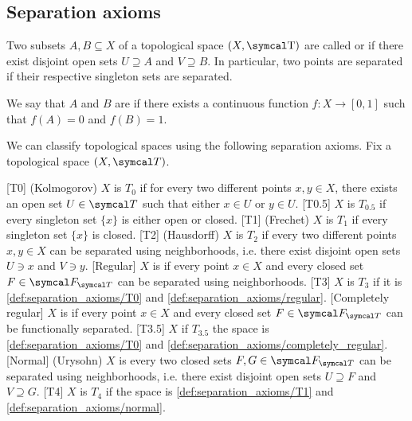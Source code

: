 \subsection{Separation axioms}\label{subsec:separation_axioms}

\begin{definition}\label{def:topological_space_separation}
  Two subsets \( A, B \subseteq X \) of a topological space \( (X, \T) \) are called  or  if there exist disjoint open sets \( U \supseteq A \) and \( V \supseteq B \). In particular, two points are separated if their respective singleton sets are separated.

  We say that \( A \) and \( B \) are  if there exists a continuous function \( f: X \to [0, 1] \) such that \( f(A) = 0 \) and \( f(B) = 1 \).
\end{definition}

\begin{definition}\label{def:separation_axioms}
  We can classify topological spaces using the following separation axioms. Fix a topological space \( (X, \Cal{T}) \).

  \begin{description}
    [T0] (Kolmogorov) \( X \) is \( T_0 \) if for every two different points \( x, y \in X \), there exists an open set \( U \in \Cal{T} \) such that either \( x \in U \) or \( y \in U \).
    [T0.5] \( X \) is \( T_{0.5} \) if every singleton set \( \{ x \} \) is either open or closed.
    [T1] (Frechet) \( X \) is \( T_1 \) if every singleton set \( \{ x \} \) is closed.
    [T2] (Hausdorff) \( X \) is \( T_2 \) if every two different points \( x, y \in X \) can be separated using neighborhoods, i.e. there exist disjoint open sets \( U \ni x \) and \( V \ni y \).
    [Regular] \( X \) is  if every point \( x \in X \) and every closed set \( F \in \Cal{F}_{\Cal{T}} \) can be separated using neighborhoods.
    [T3] \( X \) is \( T_3 \) if it is \ref{def:separation_axioms/T0} and \ref{def:separation_axioms/regular}.
    [Completely regular] \( X \) is  if every point \( x \in X \) and every closed set \( F \in \Cal{F}_{\Cal{T}} \) can be functionally separated.
    [T3.5] \( X \) if \( T_{3.5} \) the space is \ref{def:separation_axioms/T0} and \ref{def:separation_axioms/completely_regular}.
    [Normal] (Urysohn) \( X \) is  every two closed sets \( F, G \in \Cal{F}_{\Cal{T}} \) can be separated using neighborhoods, i.e. there exist disjoint open sets \( U \supseteq F \) and \( V \supseteq G \).
    [T4] \( X \) is \( T_4 \) if the space is \ref{def:separation_axioms/T1} and \ref{def:separation_axioms/normal}.
  \end{description}
\end{definition}

